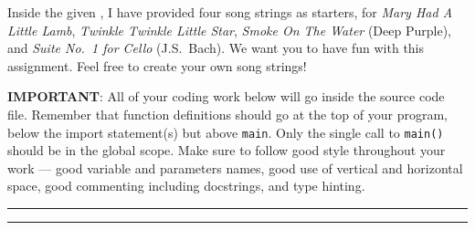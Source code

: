 \documentclass[10pt]{article}
\begin{document}
    Inside the given \prog, I have provided four song strings as
    starters, for {\it Mary Had A Little Lamb}, {\it Twinkle Twinkle Little
    Star}, {\it Smoke On The Water} (Deep Purple), and {\it Suite No.\ 1 for
    Cello} (J.S.\ Bach).
    We want you to have fun with this assignment.
    Feel free to create your own song strings!

    {\bf IMPORTANT}: 
    All of your coding work below will go inside the \prog source code
    file.
    Remember that function definitions should go at the top of your
    program, below the import statement(s) but above {\tt main}.
    Only the single call to {\tt main()} should be in the global scope.
    Make sure to follow good style throughout your work --- good variable and
    parameters names, good use of vertical and horizontal space, good
    commenting including docstrings, and type hinting.

  \vspace*{10pt} \hrule \vspace*{1pt} \hrule

  \newpage
\end{document}
